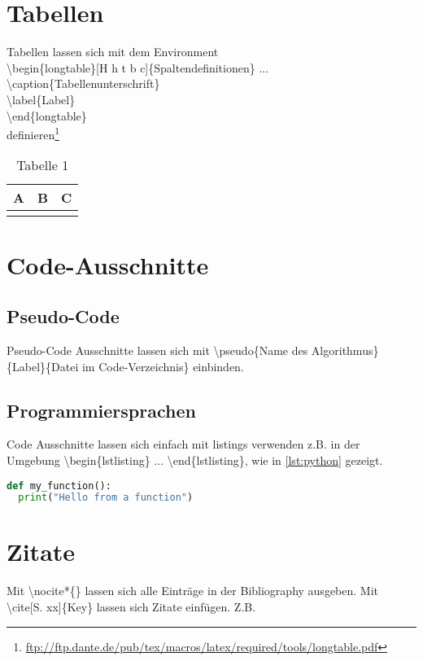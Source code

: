 \section{Tabellen}
Tabellen lassen sich mit dem Environment\\
\textbackslash begin\{longtable\}[H h t b c]\{Spaltendefinitionen\} ...\\
\qquad\qquad \textbackslash caption\{Tabellenunterschrift\}\\
\qquad\qquad \textbackslash label\{Label\}\\
\textbackslash end\{longtable\}\\
 definieren\footnote{\url{ftp://ftp.dante.de/pub/tex/macros/latex/required/tools/longtable.pdf}}\\
\begin{longtable}[H]{|p{}|p{}|p{}|}
\hline
A&B&C\\
\hline
\caption{Tabelle 1}
\label{tab:tab1}
\end{longtable}

\section{Code-Ausschnitte}

\subsection{Pseudo-Code}
Pseudo-Code Ausschnitte lassen sich mit \textbackslash pseudo\{Name des Algorithmus\}\{Label\}\{Datei im Code-Verzeichnis\} einbinden.

\subsection{Programmiersprachen}
Code Ausschnitte lassen sich einfach mit listings verwenden z.B. in der Umgebung \textbackslash begin\{lstlisting\} ... \textbackslash end\{lstlisting\}, wie in \autoref{lst:python} gezeigt.

\begin{lstlisting}[language=Python, caption={Simple Python program}, label=lst:python]
def my_function():
  print("Hello from a function")
\end{lstlisting}

\section{Zitate}
Mit \textbackslash nocite*\{\} lassen sich alle Einträge in der Bibliography ausgeben. Mit \textbackslash cite[S. xx]\{Key\} lassen sich Zitate einfügen. Z.B. \cite[S. 234]{Kurose12} \nocite*{}
